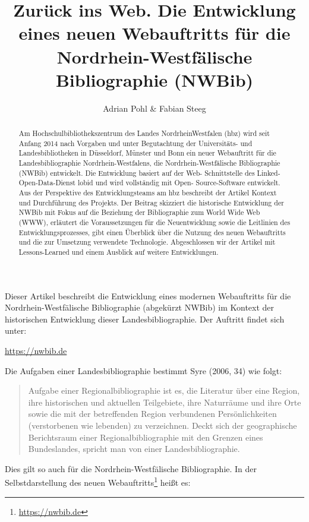 \documentclass[a4paper,
fontsize=11pt,
oneside,
numbers=noperiodatend,
parskip=half-,
bibliography=totoc,
final
]{scrartcl}
\title{\LARGE{Zurück ins Web. Die Entwicklung eines neuen Webauftritts für die Nordrhein-Westfälische Bibliographie (NWBib)}} %
\author{Adrian Pohl \& Fabian Steeg} %
\date{}
\begin{document}
\maketitle
\thispagestyle{fancyplain} 

\begin{abstract}
\small
Am Hochschulbibliothekszentrum des Landes Nordrhein\-West\-falen (hbz) wird
seit Anfang 2014 nach Vorgaben und unter Begutachtung der Uni\-ver\-si\-täts-
und Landesbibliotheken in Düsseldorf, Münster und Bonn ein neuer
Webauftritt für die Landesbibliographie Nordrhein-West\-falens, die
Nordrhein-Westfälische Bibliographie (NWBib) entwickelt. Die Entwicklung
basiert auf der Web- Schnittstelle des Linked-Open-Data-Dienst lobid und
wird vollständig mit Open- Source-Software entwickelt. Aus der
Perspektive des Entwicklungsteams am hbz beschreibt der Artikel Kontext
und Durchführung des Projekts. Der Beitrag skizziert die historische
Entwicklung der NWBib mit Fokus auf die Beziehung der Bibliographie zum
World Wide Web (WWW), erläutert die Voraussetzungen für die
Neuentwicklung sowie die Leitlinien des Entwicklungsprozesses, gibt
einen Überblick über die Nutzung des neuen Webauftritts und die zur
Umsetzung verwendete Technologie. Abgeschlossen wir der Artikel mit
Lessons-Learned und einem Ausblick auf weitere Entwicklungen.
\end{abstract}

Dieser Artikel beschreibt die Entwicklung eines modernen Webauftritts
für die Nord\-rhein-West\-fälische Bibliographie (abgekürzt NWBib) im
Kontext der historischen Entwicklung dieser Landesbibliographie. Der
Auftritt findet sich unter:

\begin{center}
\url{https://nwbib.de}
\end{center}

Die Aufgaben einer Landesbibliographie bestimmt Syre (2006, 34) wie
folgt:

\begin{quote}
Aufgabe einer Regionalbibliographie ist es, die Literatur über eine
Region, ihre historischen und aktuellen Teilgebiete, ihre Naturräume und
ihre Orte sowie die mit der betreffenden Region verbundenen
Persönlichkeiten (verstorbenen wie lebenden) zu verzeichnen. Deckt sich
der geographische Berichtsraum einer Regionalbibliographie mit den
Grenzen eines Bundeslandes, spricht man von einer Landesbibliographie.
\end{quote}

Dies gilt so auch für die Nordrhein-West\-fälische Bibliographie. In der
Selbstdarstellung des neuen Webauftritts\footnote{\url{https://nwbib.de}}
heißt es:
\end{document}
